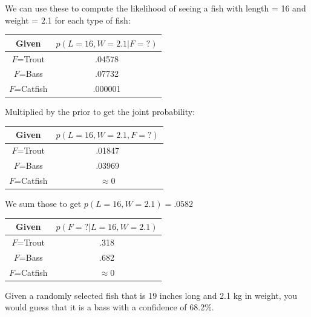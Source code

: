 We can use these to compute the likelihood of seeing a fish with length = 16 and weight = 2.1 for each type of fish:

\begin{tabular}{c | c }
Given & $p(L=16, W=2.1 | F=?)$ \\
\hline
$F$=Trout & .04578 \\
$F$=Bass &  .07732 \\
$F$=Catfish  & .000001 
\end{tabular}

Multiplied by the prior to get the joint probability:

\begin{tabular}{c | c }
Given & $p(L=16, W=2.1, F=?)$ \\
\hline
$F$=Trout & .01847 \\
$F$=Bass &  .03969 \\
$F$=Catfish  &  $\approx 0$
\end{tabular}

We sum those to get $p(L=16, W=2.1) = .0582$

\begin{tabular}{c | c }
Given & $p(F=? | L=16, W=2.1)$ \\
\hline
$F$=Trout & .318 \\
$F$=Bass &  .682 \\
$F$=Catfish  &  $\approx 0$
\end{tabular}

Given a randomly selected fish that is 19 inches long and 2.1 kg in weight,  you would guess that it is a bass with a confidence of 68.2\%.


